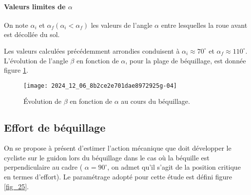 

\paragraph*{Valeurs limites de \(\alpha\)} On note \(\alpha_{i}\) et \(\alpha_{f}\left(\alpha_{i}<\alpha_{f}\right)\) les valeurs de l'angle \(\alpha\) entre lesquelles la roue avant est décollée du sol.


Les valeurs calculées précédemment arrondies conduisent à \(\alpha_{i} \approx 70^{\circ}\) et \(\alpha_{f} \approx 110^{\circ}\). L'évolution de l'angle \(\beta\) en fonction de \(\alpha\), pour la plage de béquillage, est donnée figure \ref{fig_24}.


\begin{figure}[!htb]
\begin{center}
\texttt{[image: 2024\_12\_06\_8b2ce2e701dae8972925g-04]}
\caption{Évolution de \(\beta\) en fonction de \(\alpha\) au cours du béquillage. \label{fig_24}}
\end{center}
\end{figure}


\subsection{Effort de béquillage}
On se propose à présent d'estimer l'action mécanique que doit développer le cycliste sur le guidon lors du béquillage dans le cas où la béquille est perpendiculaire au cadre ( \(\alpha=90^{\circ}\), on admet qu'il s'agit de la position critique en termes d'effort). Le paramétrage adopté pour cette étude est défini figure \ref{fig_25}.\\

